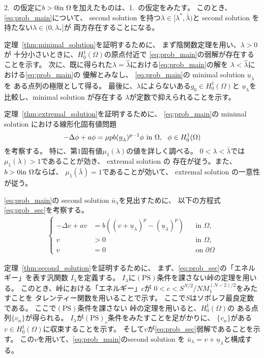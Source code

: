 2.~の仮定に$b > 0 \text{in}~ \Omega$を加えたものは、1.~の仮定をみたす。
このとき、\ref{eq:prob_main}について、
second solution を持つ$\lambda \in [\lambda^*, \bar{\lambda})$と
second solution を持たない$\lambda \in (0, \lambda_*]$が
両方存在することになる。

定理~\ref{thm:minimal_solution}を証明するために、
まず陰関数定理を用い、$\lambda > 0$が
十分小さいときに、$H_0^1(\Omega)$の原点付近で
\ref{eq:prob_main}の弱解が存在することを示す。
次に、既に得られた$\lambda = \hat{\lambda}$における\ref{eq:prob_main}の解を
$\lambda < \hat{\lambda}$における\ref{eq:prob_main}の
優解とみなし、
\ref{eq:prob_main}の minimal solution $\underline{u}_\lambda$を
ある点列の極限として得る。
最後に、$\lambda$によらないある$g_0 \in H_0^1(\Omega)$と
$\underline{u}_\lambda$を比較し、minimal solution が存在する
$\lambda$が定数で抑えられることを示す。

定理~\ref{thm:extremal_solution}を証明するために、
\ref{eq:prob_main}の minimal solution における線形化固有値問題
\[
-\Delta \phi + a \phi = \mu p b (\underline{u}_\lambda)^{p-1} \phi
  ~\text{in}~ \Omega, \ \ \phi \in H_0^1(\Omega)
\] 
を考察する。
特に、第$1$固有値$\mu_1(\lambda)$の値を詳しく調べる。
$0 < \lambda < \bar{\lambda}$では
$\mu_1(\lambda) > 1$であることが効き、
extremal solution の
存在が従う。また、$b > 0 \text{in}~ \Omega$ならば、
$\mu_1(\bar{\lambda}) = 1$であることが効いて、
extremal solution の一意性が従う。

\ref{eq:prob_main}の second solution
$\bar{u}_\lambda$を見出すために、
以下の方程式\ref{eq:prob_sec}を考察する。
\begin{align}
 \left\{
 \begin{aligned}
   -\Delta v + a v &= b \left( (v + \underline{u}_\lambda)^p -
  (\underline{u}_\lambda)^p \right) 
  & &\text{in~} \Omega, \\
  v &> 0 & &\text{in~} \Omega, \\
  v &= 0 & &\text{on~} \partial\Omega
 \end{aligned}
 \right. \tag*{$(\heartsuit)_\lambda$} \label{eq:prob_sec}
\end{align}

定理~\ref{thm:second_solution}を証明するために、
まず、\ref{eq:prob_sec}の「エネルギー」を表す汎関数
$I_\lambda$を定義する。
$I_\lambda$に$(\mathrm{PS})$条件を課さない峠の定理を用いる。
このとき、峠における「エネルギー」$c$が
$0 < c < S^{N/2} / NM_1^{(N-2)/2}$をみたすことを
タレンティー関数を用いることで示す。
ここで$S$はソボレフ最良定数である。
ここで$(\mathrm{PS})$条件を課さない
峠の定理を用いると、$H_0^1(\Omega)$の
ある点列$\{ v_n \}$が得られる。
$I_\lambda$が$(\mathrm{PS})_c$条件をみたすことを足がかりに、
$\{ v_n \}$がある$v \in H_0^1(\Omega)$に収束することを示す。
そして$v$が\ref{eq:prob_sec}弱解であることを示す。
この$v$を用いて、\ref{eq:prob_main}のsecond solution を
$\bar{u}_\lambda = v + \underline{u}_\lambda$と構成する。


